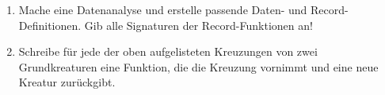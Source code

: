 \begin{aufgabe}
  \begin{enumerate}

  \item Mache eine Datenanalyse und erstelle
    passende Daten- und Record-Definitionen.  Gib alle
    Signaturen der Record-Funktionen an!

  \item Schreibe für jede der oben aufgelisteten
    Kreuzungen von zwei Grundkreaturen eine Funktion, die die Kreuzung
    vornimmt und eine neue Kreatur zurückgibt.
  \end{enumerate}
\end{aufgabe}


